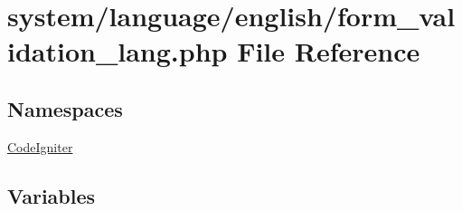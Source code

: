 \hypertarget{form__validation__lang_8php}{}\section{system/language/english/form\+\_\+validation\+\_\+lang.php File Reference}
\label{form__validation__lang_8php}
\subsection*{Namespaces}
\begin{DoxyCompactItemize}
\item 
 \mbox{\hyperlink{namespace_code_igniter}{Code\+Igniter}}
\end{DoxyCompactItemize}
\subsection*{Variables}
